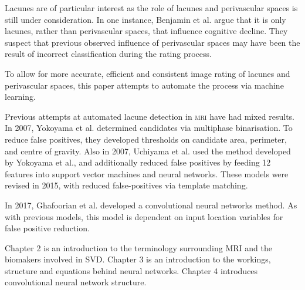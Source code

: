 Lacunes are of particular interest as the role of lacunes and perivascular spaces is still under consideration. In one instance, Benjamin et al. \cite{BenjaminJ.Philip2018LIbN} argue that it is only lacunes, rather than perivascular spaces, that influence cognitive decline. They suspect that previous observed influence of perivascular spaces may have been the result of incorrect classification during the rating process.

To allow for more accurate, efficient and consistent image rating of lacunes and perivascular spaces, this paper attempts to automate the process via machine learning.

Previous attempts at automated lacune detection in \textsc{mri} have had mixed results. In 2007, Yokoyama et al. \cite{Yokoyama2007} determined candidates via multiphase binarisation. To reduce false positives, they developed thresholds on candidate area, perimeter, and centre of gravity. Also in 2007, Uchiyama et al. \cite{Uchiyama20071554, Uchiyama2007b} used the method developed by Yokoyama et al., and additionally reduced false positives by feeding 12 features into support vector machines and neural networks. These models were revised in 2015\cite{Uchiyama2015}, with reduced false-positives via template matching.

In 2017, Ghafoorian et al. \cite{GhafoorianM.2017Dml3} developed a convolutional neural networks method. As with previous models, this model is dependent on input location variables for false positive reduction. 

Chapter 2 is an introduction to the terminology surrounding MRI and the biomakers involved in SVD. Chapter 3 is an introduction to the workings, structure and equations behind neural networks. Chapter 4 introduces convolutional neural network structure.

%
%
%





%